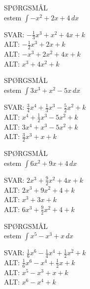 \documentclass[]{article}
\newcounter{spgcounter}
\newenvironment{question}[2]{\addtocounter{spgcounter}{1} SPØRGSMÅL \thespgcounter\\}{\hspace{50px}}
\newcommand{\answer}[1]{{\color{green} SVAR: #1}\\}
\newcommand{\alt}[1]{{\color{red} ALT: #1}\\}
\begin{document}
\begin{question}{multi}

Bestem $\int{-x^2 + 2x + 4}\, dx$

\answer{$-\frac{1}{3}x^3 + x^2 + 4x + k$}
\alt{$-\frac{1}{2}x^3 + 2x + k$}
\alt{$-x^3 + 2x^2 + 4x + k$}
\alt{$x^3 + 4x^2 + k$}

\end{question}

\begin{question}{multi}

Bestem $\int{3x^3 + x^2 - 5x}\, dx$

\answer{$\frac{3}{4}x^4 + \frac{1}{3}x^3 - \frac{5}{2}x^2 + k$}
\alt{$x^4 + \frac{1}{2}x^3 - 5x^2 + k$}
\alt{$3x^4 + x^3 - 5x^2 + k$}
\alt{$\frac{3}{2}x^3 + x + k$}

\end{question}

\begin{question}{multi}

Bestem $\int{6x^2 + 9x + 4}\, dx$

\answer{$2x^3 + \frac{9}{2}x^2 + 4x + k$}
\alt{$2x^3 + 9x^2 + 4 + k$}
\alt{$x^3 + 3x + k$}
\alt{$6x^3 + \frac{9}{2}x^2 + 4 + k$}

\end{question}

\begin{question}{multi}

Bestem $\int{x^5 - x^3 + x}\, dx$

\answer{$\frac{1}{6}x^6 - \frac{1}{4}x^4 + \frac{1}{2}x^2 + k$}
\alt{$\frac{1}{6}x^6 - x^4 + \frac{1}{2}x + k$}
\alt{$x^5 - x^3 + x + k$}
\alt{$x^6 - x^4 + k$}

\end{question}
\end{document}
